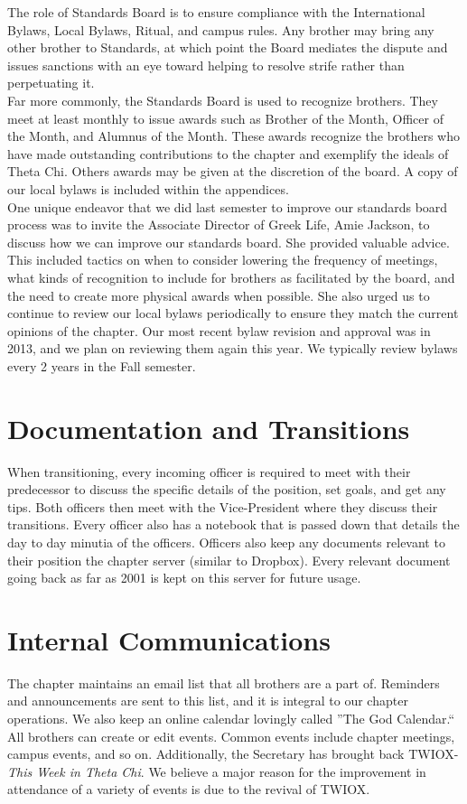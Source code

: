       The role of Standards Board is to ensure compliance with the International Bylaws, Local Bylaws, Ritual, and campus rules. Any brother may bring any other brother to Standards, at which point the Board mediates the dispute and issues sanctions with an eye toward helping to resolve strife rather than perpetuating it. \\

      Far more commonly, the Standards Board is used to recognize brothers. They meet at least monthly to issue awards such as Brother of the Month, Officer of the Month, and Alumnus of the Month. These awards recognize the brothers who have made outstanding contributions to the chapter and exemplify the ideals of Theta Chi. Others awards may be given at the discretion of the board. A copy of our local bylaws is included within the appendices. \\
      
      One unique endeavor that we did last semester to improve our standards board process was to invite the Associate Director of Greek Life, Amie Jackson, to discuss how we can improve our standards board. She provided valuable advice. This included tactics on when to consider lowering the frequency of meetings, what kinds of recognition to include for brothers as facilitated by the board, and the need to create more physical awards when possible. She also urged us to continue to review our local bylaws periodically to ensure they match the current opinions of the chapter. Our most recent bylaw revision and approval was in 2013, and we plan on reviewing them again this year. We typically review bylaws every 2 years in the Fall semester.
      
    \section*{Documentation and Transitions}
      When transitioning, every incoming officer is required to meet with their predecessor to discuss the specific details of the position, set goals, and get any tips. Both officers then meet with the Vice-President where they discuss their transitions. Every officer also has a notebook that is passed down that details the day to day minutia of the officers. Officers also keep any documents relevant to their position the chapter server (similar to Dropbox). Every relevant document going back as far as 2001 is kept on this server for future usage.
      
    \section*{Internal Communications}
      The chapter maintains an email list that all brothers are a part of. Reminders and announcements are sent to this list, and it is integral to our chapter operations. We also keep an online calendar lovingly called ''The God Calendar.`` All brothers can create or edit events. Common events include chapter meetings, campus events, and so on. Additionally, the Secretary has brought back TWIOX- \textit{This Week in Theta Chi}. We believe a major reason for the improvement in attendance of a variety of events is due to the revival of TWIOX.